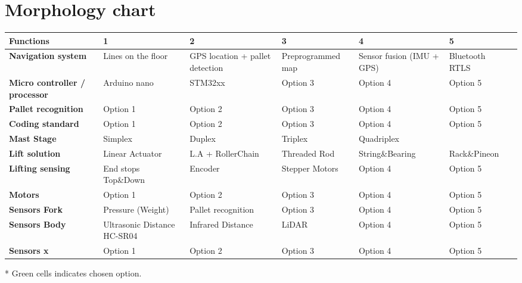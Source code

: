 \documentclass[landscape]{article}
\begin{document}
\section{Morphology chart}
\begin{table}[H]
    \begin{center}
        \begin{tabularx}{\linewidth}{L|L|L|L|L|L|L}
            \textbf{Functions} & \textbf{1} & \textbf{2}& \textbf{3} & 
            \textbf{4} & \textbf{5} \\
            \hline
            \textbf{Navigation system} & Lines on the floor & GPS location + pallet detection & Preprogrammed map  & Sensor fusion (IMU + GPS) & 
            Bluetooth RTLS \\
            \hline
            \textbf{Micro controller / processor} & Arduino nano & STM32xx & Option 3 & Option 4 & 
            Option 5 \\
            \hline
            \textbf{Pallet recognition} & Option 1 & Option 2 & Option 3 & Option 4 & 
            Option 5 \\
            \hline
            \textbf{Coding standard} & Option 1 & Option 2 & Option 3 & Option 4 & 
            Option 5 \\
            \hline
            \textbf{Mast Stage} & Simplex & Duplex & Triplex & Quadriplex & 
            \\
            \hline
            \textbf{Lift solution} & Linear Actuator & L.A + RollerChain & Threaded Rod& String\&Bearing & Rack\&Pineon \\
            \hline
            \textbf{Lifting sensing} & End stops Top\&Down & Encoder & Stepper Motors & Option 4 & 
            Option 5 \\
            \hline
            \textbf{Motors} & Option 1 & Option 2 & Option 3 & Option 4 & 
            Option 5 \\
            \hline
            \textbf{Sensors Fork} & Pressure (Weight) & Pallet recognition & Option 3 & Option 4 & 
            Option 5 \\
            \hline
            \textbf{Sensors Body} & Ultrasonic Distance HC-SR04 & Infrared Distance & LiDAR & Option 4 & 
            Option 5 \\
            \hline
            \textbf{Sensors x} & Option 1 & Option 2 & Option 3 & Option 4 & 
            Option 5 \\
            \hline
        \end{tabularx}
    \end{center}
\end{table}
* Green cells indicates chosen option.
\end{document}
